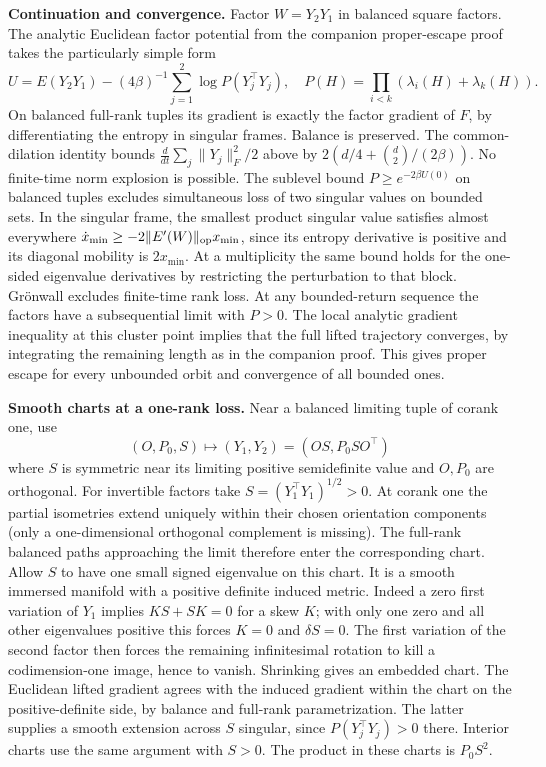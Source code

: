 \documentclass[10pt]{article}
\begin{document}
\textbf{Continuation and convergence.} Factor $W=Y_2Y_1$ in balanced square factors. The analytic Euclidean factor potential from the companion proper-escape proof takes the particularly simple form
\[
 U=E(Y_2Y_1)-(4\beta)^{-1}\sum_{j=1}^2\log P(Y_j^\top Y_j),\quad
 P(H)=\prod_{i<k}(\lambda_i(H)+\lambda_k(H)).
\]
On balanced full-rank tuples its gradient is exactly the factor gradient of $F$, by differentiating the entropy in singular frames. Balance is preserved. The common-dilation identity bounds $\frac d{dt}\sum_j\|Y_j\|_F^2/2$ above by $2(d/4+\binom d2/(2\beta))$. No finite-time norm explosion is possible. The sublevel bound $P\ge e^{-2\beta U(0)}$ on balanced tuples excludes simultaneous loss of two singular values on bounded sets. In the singular frame, the smallest product singular value satisfies almost everywhere $\dot x_{\min}\ge-2\|E'(W)\|_{\rm op}x_{\min}$, since its entropy derivative is positive and its diagonal mobility is $2x_{\min}$. At a multiplicity the same bound holds for the one-sided eigenvalue derivatives by restricting the perturbation to that block. Grönwall excludes finite-time rank loss. At any bounded-return sequence the factors have a subsequential limit with $P>0$. The local analytic gradient inequality at this cluster point implies that the full lifted trajectory converges, by integrating the remaining length as in the companion proof. This gives proper escape for every unbounded orbit and convergence of all bounded ones.

\textbf{Smooth charts at a one-rank loss.} Near a balanced limiting tuple of corank one, use
\[
 (O,P_0,S)\longmapsto (Y_1,Y_2)=(OS,P_0 S O^\top)
\]
where $S$ is symmetric near its limiting positive semidefinite value and $O,P_0$ are orthogonal. For invertible factors take $S=(Y_1^\top Y_1)^{1/2}>0$. At corank one the partial isometries extend uniquely within their chosen orientation components (only a one-dimensional orthogonal complement is missing). The full-rank balanced paths approaching the limit therefore enter the corresponding chart. Allow $S$ to have one small signed eigenvalue on this chart. It is a smooth immersed manifold with a positive definite induced metric. Indeed a zero first variation of $Y_1$ implies $KS+SK=0$ for a skew $K$; with only one zero and all other eigenvalues positive this forces $K=0$ and $\delta S=0$. The first variation of the second factor then forces the remaining infinitesimal rotation to kill a codimension-one image, hence to vanish. Shrinking gives an embedded chart. The Euclidean lifted gradient agrees with the induced gradient within the chart on the positive-definite side, by balance and full-rank parametrization. The latter supplies a smooth extension across $S$ singular, since $P(Y_j^\top Y_j)>0$ there. Interior charts use the same argument with $S>0$. The product in these charts is $P_0S^2$.
\end{document}
